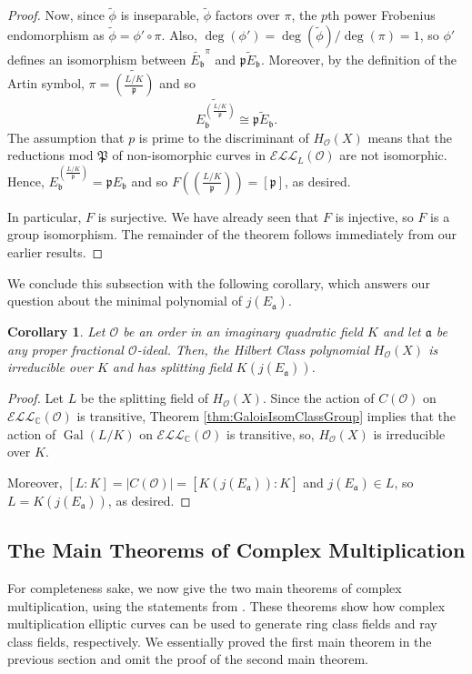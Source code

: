 \documentclass{amsart}
\newtheorem{cor}[thm]{Corollary}
\theoremstyle{definition}
\theoremstyle{remark}
\numberwithin{equation}{section}
\newcommand{\cE}{\mathcal E}
\newcommand{\cL}{\mathcal L}
\newcommand{\cO}{\mathcal O}
\newcommand{\fka}{\mathfrak a}
\newcommand{\fkb}{\mathfrak b}
\newcommand{\fkp}{\mathfrak p}
\newcommand{\fkP}{\mathfrak{P}}
\newcommand{\bbC}{\mathbb C}
\newcommand{\ELL}{\cE\cL\cL}
\newcommand{\artin}[2]{\left( \frac{#1}{#2}\right)}
\DeclareMathOperator{\Gal}{Gal}
\begin{document}
\begin{proof}
 Now, since $\tilde{\phi}$ is inseparable, $\tilde{\phi}$ factors over $\pi$, the $p$th power Frobenius endomorphism as $\widetilde{\phi} = \phi' \circ \pi$. Also, $\deg(\phi') = \deg(\widetilde{\phi})/\deg(\pi) = 1$, so $\phi'$ defines an isomorphism between $\widetilde{E_{\fkb}}^{\pi}$ and $\widetilde{\fkp E_{\fkb}}$. 
 Moreover, by the definition of the Artin symbol, $\pi = \widetilde{\artin{L/K}{\fkp}}$ and so 
 \[
 \widetilde{E_{\fkb}^{\artin{L/K}{\fkp}}} \cong \widetilde{\fkp E_{\fkb}}.
 \]
 The assumption that $p$ is prime to the discriminant of $H_{\cO}(X)$ means that the reductions mod $\fkP$ of non-isomorphic curves in $\ELL_{L}(\cO)$ are not isomorphic. Hence, $E_{\fkb}^{\artin{L/K}{\fkp}} = \fkp E_{\fkb}$ and so $F\left(\artin{L/K}{\fkp}\right) = [\fkp]$, as desired.
 
 In particular, $F$ is surjective. We have already seen that $F$ is injective, so $F$ is a group isomorphism. The remainder of the theorem follows immediately from our earlier results.
\end{proof}

 We conclude this subsection with the following corollary, which answers our question about the minimal polynomial of $j(E_{\fka})$.
 
 \begin{cor} \label{cor:FirstMainTheoremOfComplexMultV1}
 Let $\cO$ be an order in an imaginary quadratic field $K$ and let $\fka$ be any proper fractional $\cO$-ideal. Then, the Hilbert Class polynomial $H_{\cO}(X)$ is irreducible over $K$ and has splitting field $K(j(E_{\fka}))$.
 \end{cor}

\begin{proof}
Let $L$ be the splitting field of $H_{\cO}(X)$. Since the action of $C(\cO)$ on $\ELL_{\bbC}(\cO)$ is transitive, Theorem \ref{thm:GaloisIsomClassGroup} implies that the action of $\Gal(L/K)$ on $\ELL_{\bbC}(\cO)$ is transitive, so, $H_{\cO}(X)$ is irreducible over $K$.

Moreover, $[L:K] = |C(\cO)| = [K(j(E_{\fka})): K]$ and $j(E_{\fka}) \in L$, so $L = K(j(E_{\fka}))$, as desired.
\end{proof}

\subsection{The Main Theorems of Complex Multiplication} \label{subsec:MainTheoremsOfCM}

For completeness sake, we now give the two main theorems of complex multiplication, using the statements from \cite{CoxPrimes}. These theorems show how complex multiplication elliptic curves can be used to generate ring class fields and ray class fields, respectively. We essentially proved the first main theorem in the previous section and omit the proof of the second main theorem.
\end{document}
